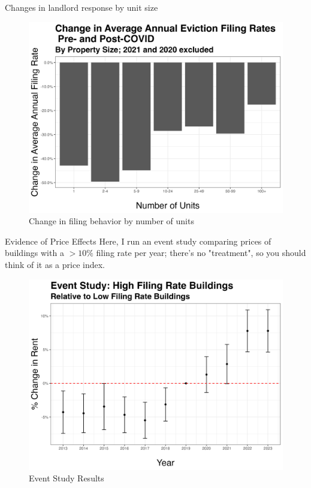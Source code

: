 \documentclass[10pt, xcolor=dvipsnames]{beamer}
\begin{document}
\begin{frame}{Changes in landlord response by unit size}
    \begin{figure}
        \centering
        \includegraphics[width=0.75\linewidth]{figs/change_in_avg_annual_eviction_filing_rates_pre_post_COVID_by_num_units.png}
        \caption{Change in filing behavior by number of units}
        \label{fig:change-evict-units}
    \end{figure}
\end{frame}

    

\begin{frame}{Evidence of Price Effects}
    Here, I run an event study comparing prices of buildings with a $>10\%$ filing rate per year; there's no "treatment", so you should think of it as a price index.
    \small
    \begin{figure}
        \centering
        \includegraphics[width=0.65\linewidth]{figs/event_study_high_filing_preCOVID.png}
        \caption{Event Study Results}
        \label{fig:placeholder}
    \end{figure}
    
\end{frame}
\end{document}
